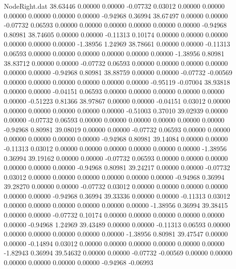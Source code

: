 \begin{filecontents}{NodeRight.dat}
  38.63446    0.00000    0.00000    -0.07732    0.03012    0.00000    0.00000    0.00000    0.00000    0.00000    0.00000   -0.94968    0.36994
  38.67497    0.00000    0.00000    -0.07732    0.06593    0.00000    0.00000    0.00000    0.00000    0.00000    0.00000   -0.94968    0.80981
  38.74605    0.00000    0.00000    -0.11313    0.10174    0.00000    0.00000    0.00000    0.00000    0.00000    0.00000   -1.38956    1.24969
  38.78661    0.00000    0.00000    -0.11313    0.06593    0.00000    0.00000    0.00000    0.00000    0.00000    0.00000   -1.38956    0.80981
  38.83712    0.00000    0.00000    -0.07732    0.06593    0.00000    0.00000    0.00000    0.00000    0.00000    0.00000   -0.94968    0.80981
  38.88759    0.00000    0.00000    -0.07732   -0.00569    0.00000    0.00000    0.00000    0.00000    0.00000    0.00000   -0.95119   -0.07004
  38.93818    0.00000    0.00000    -0.04151    0.06593    0.00000    0.00000    0.00000    0.00000    0.00000    0.00000   -0.51223    0.81366
  38.97867    0.00000    0.00000    -0.04151    0.03012    0.00000    0.00000    0.00000    0.00000    0.00000    0.00000   -0.51003    0.37010
  39.02939    0.00000    0.00000    -0.07732    0.06593    0.00000    0.00000    0.00000    0.00000    0.00000    0.00000   -0.94968    0.80981
  39.08019    0.00000    0.00000    -0.07732    0.06593    0.00000    0.00000    0.00000    0.00000    0.00000    0.00000   -0.94968    0.80981
  39.14084    0.00000    0.00000    -0.11313    0.03012    0.00000    0.00000    0.00000    0.00000    0.00000    0.00000   -1.38956    0.36994
  39.19162    0.00000    0.00000    -0.07732    0.06593    0.00000    0.00000    0.00000    0.00000    0.00000    0.00000   -0.94968    0.80981
  39.24217    0.00000    0.00000    -0.07732    0.03012    0.00000    0.00000    0.00000    0.00000    0.00000    0.00000   -0.94968    0.36994
  39.28270    0.00000    0.00000    -0.07732    0.03012    0.00000    0.00000    0.00000    0.00000    0.00000    0.00000   -0.94968    0.36994
  39.33336    0.00000    0.00000    -0.11313    0.03012    0.00000    0.00000    0.00000    0.00000    0.00000    0.00000   -1.38956    0.36994
  39.38415    0.00000    0.00000    -0.07732    0.10174    0.00000    0.00000    0.00000    0.00000    0.00000    0.00000   -0.94968    1.24969
  39.43489    0.00000    0.00000    -0.11313    0.06593    0.00000    0.00000    0.00000    0.00000    0.00000    0.00000   -1.38956    0.80981
  39.47547    0.00000    0.00000    -0.14894    0.03012    0.00000    0.00000    0.00000    0.00000    0.00000    0.00000   -1.82943    0.36994
  39.54632    0.00000    0.00000    -0.07732   -0.00569    0.00000    0.00000    0.00000    0.00000    0.00000    0.00000   -0.94968   -0.06993

\end{filecontents}
